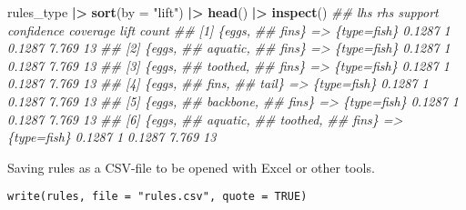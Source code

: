 \documentclass[
  notitlepage]{book}
\newenvironment{Shaded}{\begin{snugshade}}{\end{snugshade}}
\newcommand{\CommentTok}[1]{\textcolor[rgb]{0.56,0.35,0.01}{\textit{#1}}}
\newcommand{\DataTypeTok}[1]{\textcolor[rgb]{0.13,0.29,0.53}{#1}}
\newcommand{\ErrorTok}[1]{\textcolor[rgb]{0.64,0.00,0.00}{\textbf{#1}}}
\newcommand{\KeywordTok}[1]{\textcolor[rgb]{0.13,0.29,0.53}{\textbf{#1}}}
\newcommand{\NormalTok}[1]{#1}
\newcommand{\OperatorTok}[1]{\textcolor[rgb]{0.81,0.36,0.00}{\textbf{#1}}}
\newcommand{\StringTok}[1]{\textcolor[rgb]{0.31,0.60,0.02}{#1}}
\begin{document}
\begin{Shaded}
\begin{Highlighting}[]
\NormalTok{rules\_type }\OperatorTok{|}\ErrorTok{\textgreater{}}\StringTok{ }\KeywordTok{sort}\NormalTok{(}\DataTypeTok{by =} \StringTok{"lift"}\NormalTok{) }\OperatorTok{|}\ErrorTok{\textgreater{}}\StringTok{ }\KeywordTok{head}\NormalTok{() }\OperatorTok{|}\ErrorTok{\textgreater{}}\StringTok{ }\KeywordTok{inspect}\NormalTok{()}
\CommentTok{\#\#     lhs            rhs         support confidence coverage  lift count}
\CommentTok{\#\# [1] \{eggs,                                                            }
\CommentTok{\#\#      fins\}      =\textgreater{} \{type=fish\}  0.1287          1   0.1287 7.769    13}
\CommentTok{\#\# [2] \{eggs,                                                            }
\CommentTok{\#\#      aquatic,                                                         }
\CommentTok{\#\#      fins\}      =\textgreater{} \{type=fish\}  0.1287          1   0.1287 7.769    13}
\CommentTok{\#\# [3] \{eggs,                                                            }
\CommentTok{\#\#      toothed,                                                         }
\CommentTok{\#\#      fins\}      =\textgreater{} \{type=fish\}  0.1287          1   0.1287 7.769    13}
\CommentTok{\#\# [4] \{eggs,                                                            }
\CommentTok{\#\#      fins,                                                            }
\CommentTok{\#\#      tail\}      =\textgreater{} \{type=fish\}  0.1287          1   0.1287 7.769    13}
\CommentTok{\#\# [5] \{eggs,                                                            }
\CommentTok{\#\#      backbone,                                                        }
\CommentTok{\#\#      fins\}      =\textgreater{} \{type=fish\}  0.1287          1   0.1287 7.769    13}
\CommentTok{\#\# [6] \{eggs,                                                            }
\CommentTok{\#\#      aquatic,                                                         }
\CommentTok{\#\#      toothed,                                                         }
\CommentTok{\#\#      fins\}      =\textgreater{} \{type=fish\}  0.1287          1   0.1287 7.769    13}
\end{Highlighting}
\end{Shaded}

Saving rules as a CSV-file to be opened with Excel or other tools.

\texttt{write(rules,\ file\ =\ "rules.csv",\ quote\ =\ TRUE)}
\end{document}
